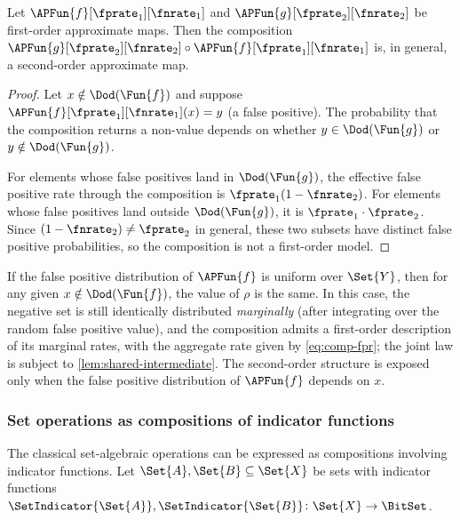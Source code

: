\documentclass[ ../main.tex]{subfiles}
\begin{document}
\begin{lemma}
\label{prop:higher-order}
Let $\APFun{f}[\fprate_1][\fnrate_1]$ and
$\APFun{g}[\fprate_2][\fnrate_2]$ be first-order approximate maps.
Then the composition
$\APFun{g}[\fprate_2][\fnrate_2] \circ
 \APFun{f}[\fprate_1][\fnrate_1]$
is, in general, a second-order approximate map.
\end{lemma}
\begin{proof}
Let $x \notin \Dod(\Fun{f})$ and suppose
$\APFun{f}[\fprate_1][\fnrate_1](x) = y$ (a false positive).
The probability that the composition returns a non-\Nothing value
depends on whether $y \in \Dod(\Fun{g})$ or $y \notin \Dod(\Fun{g})$.

For elements whose false positives land in $\Dod(\Fun{g})$, the effective
false positive rate through the composition is
$\fprate_1(1-\fnrate_2)$.
For elements whose false positives land outside $\Dod(\Fun{g})$, it is
$\fprate_1 \cdot \fprate_2$.
Since $(1-\fnrate_2) \neq \fprate_2$ in general, these two subsets have
distinct false positive probabilities, so the composition is not a
first-order model.
\end{proof}

\begin{remark}
If the false positive distribution of $\APFun{f}$ is uniform over
$\Set{Y}$, then for any given $x \notin \Dod(\Fun{f})$, the value of
$\rho$ is the same.  In this case, the negative set is still
identically distributed \emph{marginally} (after integrating over the
random false positive value), and the composition admits a
first-order description of its marginal rates, with the aggregate rate
given by \cref{eq:comp-fpr}; the joint law is subject to
\cref{lem:shared-intermediate}.  The second-order structure is exposed only when
the false positive distribution of $\APFun{f}$ depends on $x$.
\end{remark}

\subsubsection{Set operations as compositions of indicator functions}

The classical set-algebraic operations can be expressed as compositions involving indicator functions.
Let $\Set{A}, \Set{B} \subseteq \Set{X}$ be sets with indicator
functions $\SetIndicator{\Set{A}}, \SetIndicator{\Set{B}} \colon
\Set{X} \to \BitSet$.
\end{document}

